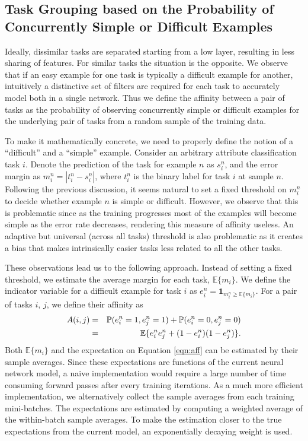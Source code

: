 \documentclass[10pt,twocolumn,letterpaper]{article}
\begin{document}
\subsection{Task Grouping based on the Probability of Concurrently Simple or Difficult Examples}
\label{sec:aff}

Ideally, dissimilar tasks are separated starting from a low layer, resulting in less sharing of features. For similar tasks the situation is the opposite. We observe that if an easy example for one task is typically a difficult example for another, intuitively a distinctive set of filters are required for each task to accurately model both in a single network. Thus we define the affinity between a pair of tasks as the probability of observing concurrently simple or difficult examples for the underlying pair of tasks from a random sample of the training data. 

To make it mathematically concrete, we need to properly define the notion of a ``difficult'' and a ``simple'' example. Consider an arbitrary attribute classification task $i$. Denote the prediction of the task for example $n$ as $s_i^n$, and the error margin as $m_i^n = |t_i^n - s_i^n|$, where $t_i^n$ is the binary label for task $i$ at sample $n$. Following the previous discussion, it seems natural to set a fixed threshold on $m_i^n$ to decide whether example $n$ is simple or difficult. However, we observe that this is problematic since as the training progresses most of the examples will become simple as the error rate decreases, rendering this measure of affinity useless. An adaptive but universal (across all tasks) threshold is also problematic as it creates a bias that makes intrinsically easier tasks less related to all the other tasks. 

These observations lead us to the following approach. Instead of setting a fixed threshold, we estimate the average margin for each task, %
$\mathbb{E}\{m_i\}$. We define the indicator variable for a difficult example for task $i$ as $e_i^n = \mathbf{1}_{m_i^n \geq \mathbb{E}\{m_i\}}$.
For a pair of tasks $i$, $j$, we define their affinity as 
\begin{eqnarray}
\vspace{-1mm}
\label{eqn:aff}
A(i,j) & = & \mathbb{P}(e_i^n=1, e_j^n=1) + \mathbb{P}(e_i^n=0, e_j^n=0) \nonumber \\
& = & \mathbb{E}\{e_i^n e_j^n + (1-e_i^n)(1-e_j^n)\}.
\vspace{-1mm}
\end{eqnarray}
Both $\mathbb{E}\{m_i\}$ and the expectation on Equation \ref{eqn:aff} can be estimated by their sample averages. Since these expectations are functions of the current neural network model, a naive implementation would require a large number of time consuming forward passes after every training iterations. As a much more efficient implementation, we alternatively collect the sample averages from each training mini-batches. The expectations are estimated by computing a weighted average of the within-batch sample averages. To make the estimation closer to the true expectations from the current model, an exponentially decaying weight is used. 
\end{document}
